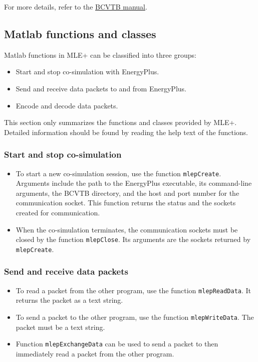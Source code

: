 \documentclass[11pt,letter]{article}
\newcommand{\MLEP}{MLE+\xspace}
\begin{document}
For more details, refer to the \href{http://simulationresearch.lbl.gov/bcvtb/releases/latest/doc/manual/index.xhtml}{BCVTB manual}.

\subsection{Matlab functions and classes}
\label{sec-4-5}

Matlab functions in \MLEP can be classified into three groups:
\begin{itemize}
\item Start and stop co-simulation with EnergyPlus.
\item Send and receive data packets to and from EnergyPlus.
\item Encode and decode data packets.
\end{itemize}

This section only summarizes the functions and classes provided by
\MLEP.  Detailed information should be found by reading the help
text of the functions.

\subsubsection{Start and stop co-simulation}
\label{sec-4-5-1}

\begin{itemize}
\item To start a new co-simulation session, use the function
\verb+mlepCreate+.  Arguments include the path to the
EnergyPlus executable, its command-line arguments, the BCVTB
directory, and the host and port number for the communication
socket.  This function returns the status and the sockets created
for communication.
\item When the co-simulation terminates, the communication sockets must be
closed by the function \verb+mlepClose+.  Its arguments are
the sockets returned by \verb+mlepCreate+.
\end{itemize}


\subsubsection{Send and receive data packets}
\label{sec-4-5-2}

\begin{itemize}
\item To read a packet from the other program, use the function
\verb+mlepReadData+.  It returns the packet as a text
string.
\item To send a packet to the other program, use the function
\verb+mlepWriteData+.  The packet must be a text
string.
\item Function \verb+mlepExchangeData+ can be used to send a
packet to then immediately read a packet from the other program.
\end{itemize}
\end{document}

